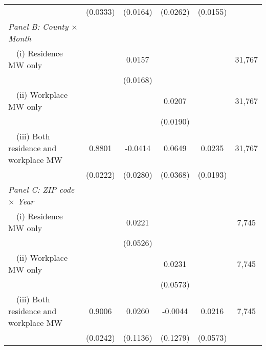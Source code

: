 \begin{landscape}
\begin{table}[ht!]
\begin{tabular}{@{}lccccc@{}}
                                                             & (0.0333) & (0.0164) & (0.0262) & (0.0155) &      \\
        \textit{Panel B: County $\times$ Month}              &       &       &       &       &      \\
        $\quad$(i) Residence MW only                         &       &  0.0157  &       &       & 31,767 \\
                                                             &       & (0.0168) &       &       &      \\
        $\quad$(ii) Workplace MW only                        &       &       &  0.0207  &       & 31,767 \\
                                                             &       &       & (0.0190) &       &      \\
        $\quad$(iii) Both residence and workplace MW         &  0.8801  &  -0.0414  &  0.0649  &  0.0235  & 31,767 \\
                                                             & (0.0222) & (0.0280) & (0.0368) & (0.0193) &      \\
        \textit{Panel C: ZIP code $\times$ Year}             &       &       &       &       &      \\
        $\quad$(i) Residence MW only                         &       &  0.0221  &       &       & 7,745 \\
                                                             &       & (0.0526) &       &       &      \\
        $\quad$(ii) Workplace MW only                        &       &       &  0.0231  &       & 7,745 \\
                                                             &       &       & (0.0573) &       &      \\
        $\quad$(iii) Both residence and workplace MW         &  0.9006  &  0.0260  &  -0.0044  &  0.0216  & 7,745 \\
                                                             & (0.0242) & (0.1136) & (0.1279) & (0.0573) &      \\ \bottomrule
    \end{tabular}
    

\end{table}
\end{landscape}
